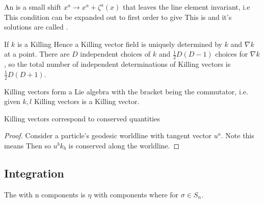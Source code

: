 \documentclass{article}
\begin{document}
\begin{definition}
An  is a small shift $x^a \to x^a + \zeta^a(x)$ that leaves the line element invariant, i.e
This condition can be expanded out to first order to give 
This is  and it's solutions are called .
\end{definition}

\begin{lemma}
If $k$ is a Killing 
Hence a Killing vector field is uniquely determined by $k$ and $\nabla k$ at a point. There are $D$ independent choices of $k$ and $\frac{1}{2}D(D-1)$ choices for $\nabla k$, so the total number of independent determinations of Killing vectors is $\frac{1}{2}D(D+1)$. 
\end{lemma}

\begin{lemma}
Killing vectors form a Lie algebra with the bracket being the commutator, i.e. given $k,l$ Killing vectors
is a Killing vector. 
\end{lemma}

\begin{lemma}
Killing vectors correspond to conserved quantities
\end{lemma}
\begin{proof}
Consider a particle's geodesic worldline with tangent vector $u^a$. Note this means 
Then 
so $u^b k_b$ is conserved along the worldline. 
\end{proof}
\subsection{Integration}

\begin{definition}
The  with n components is $\eta$ with components 
where
for $\sigma \in S_n$. 
\end{definition}
\end{document}
